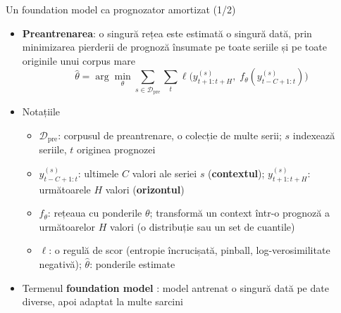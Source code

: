 \begin{frame}{Un foundation model ca prognozator amortizat (1/2)}
\itemsize{\small}
\begin{itemize}
    \item \textbf{Preantrenarea}: o singură rețea este estimată o singură dată, prin minimizarea pierderii de prognoză însumate pe toate seriile și pe toate originile unui corpus mare \[ \hat\theta = \arg\min_\theta \sum_{s \in \mathcal D_{\mathrm{pre}}}\sum_t \ell\big(y^{(s)}_{t+1:t+H},\; f_\theta(y^{(s)}_{t-C+1:t})\big) \]
    \item Notațiile
    \begin{itemize}
        \item $\mathcal D_{\mathrm{pre}}$: corpusul de preantrenare, o colecție de multe serii; $s$ indexează seriile, $t$ originea prognozei
        \item $y^{(s)}_{t-C+1:t}$: ultimele $C$ valori ale seriei $s$ (\textbf{contextul}); $y^{(s)}_{t+1:t+H}$: următoarele $H$ valori (\textbf{orizontul})
        \item $f_\theta$: rețeaua cu ponderile $\theta$; transformă un context într-o prognoză a următoarelor $H$ valori (o distribuție sau un set de cuantile)
        \item $\ell$: o regulă de scor (entropie încrucișată, pinball, log-verosimilitate negativă); $\hat\theta$: ponderile estimate
    \end{itemize}
    \item Termenul \textbf{foundation model} : model antrenat o singură dată pe date diverse, apoi adaptat la multe sarcini
\end{itemize}
\end{frame}

